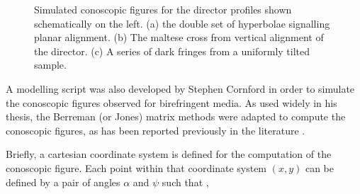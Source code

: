 \begin{figure}
\begin{center}
\end{center}
\caption[Simulated conoscopic images for planar, vertical and tilted alignment]{\label{fig:con_samples}Simulated conoscopic figures for the director profiles shown schematically on the left. (a) the double set of hyperbolae signalling planar alignment. (b) The maltese cross from vertical alignment of the director. (c) A series of dark fringes from a uniformly tilted sample.}
\end{figure}

A modelling script was also developed by Stephen Cornford \cite{Cornford2008} in order to simulate the conoscopic figures observed for birefringent media. As used widely in his thesis, the Berreman \cite{Berreman1972} (or Jones) matrix methods were adapted to compute the conoscopic figures, as has been reported previously in the literature \cite{Ogasawara2001,Parry-Jones2002}.

Briefly, a cartesian coordinate system is defined for the computation of the conoscopic figure. Each point within that coordinate system $\left(x,y\right)$ can be defined by a pair of angles $\alpha$ and $\psi$ such that \cite{Cornford2008},

